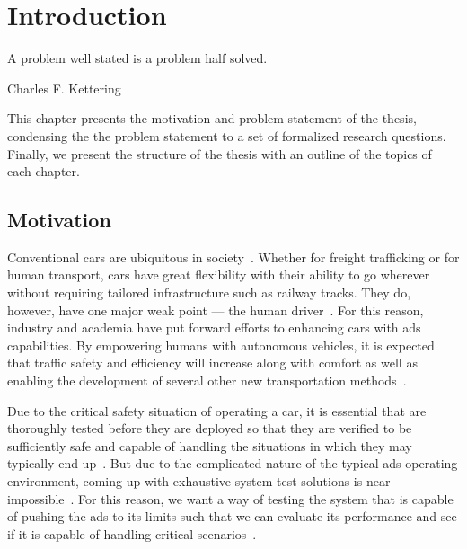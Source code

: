 \chapter{Introduction}\label{chp:introduction}

\epigraph{A problem well stated is a problem half solved.}{Charles F. Kettering}

This chapter presents the motivation and problem statement of the thesis,
condensing the the problem statement to a set of formalized research questions.
Finally, we present the structure of the thesis with an outline of the topics of
each chapter.

\section{Motivation}

Conventional cars are ubiquitous in society~\cite[1]{thorgersen2021why}. Whether for freight
trafficking or for human transport, cars have great flexibility with their ability to go wherever
without requiring tailored infrastructure such as railway tracks. They do, however, have one major
weak point --- the human driver~\cite[67]{Riener2010}. For this reason, industry and academia have
put forward efforts to enhancing cars with \acrfull{ads} capabilities. By empowering humans with
autonomous vehicles, it is expected that traffic safety and efficiency will increase along with
comfort as well as enabling the development of several other new transportation methods~\cite[1-2,
    1]{Eichberger2020, weiADSAdoption}.

Due to the critical safety situation of operating a car, it is essential that  are
thoroughly tested before they are deployed so that they are verified to be sufficiently safe and
capable of handling the situations in which they may typically end
up~\cite[1]{surveyLLMScenarioBasedTesting}.
But due to the complicated nature of the typical
\acrshort{ads} operating environment, coming up with exhaustive system test solutions is near
impossible~\cite[52]{DeepScenario}. For this reason, we want a way of testing the system that is
capable of pushing the \acrshort{ads} to its limits such that we can evaluate its performance and
see if it is capable of handling critical scenarios~\cite{yao2025agentsllm}.

